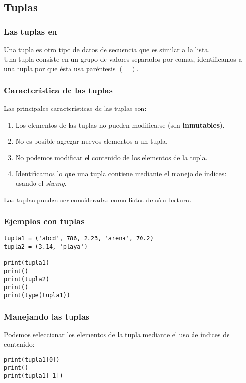 \documentclass[12pt]{beamer}
\begin{document}
\subsection{Tuplas}

\begin{frame}
\frametitle{Las tuplas en \python}
Una tupla es otro tipo de datos de secuencia que es similar a la lista.
\\
\bigskip
\pause
Una tupla consiste en un grupo de valores separados por comas, identificamos a una tupla por que ésta usa paréntesis $( \quad )$.
\end{frame}
\begin{frame}
\frametitle{Característica de las tuplas}
Las principales características de las tuplas son:
\pause
{}
\begin{enumerate}[<+->]
\item Los elementos de las tuplas no pueden modificarse (son \textbf{inmutables}).
\item No es posible agregar nuevos elementos a un tupla.
\item No podemos modificar el contenido de los elementos de la tupla.
\item Identificamos lo que una tupla contiene mediante el manejo de índices: usando el \emph{slicing}.
\end{enumerate}
\pause
Las tuplas pueden ser consideradas como listas de sólo lectura.
\end{frame}
\begin{frame}[fragile]
\frametitle{Ejemplos con tuplas}
\begin{lstlisting}[caption=Definiendo tuplas]
tupla1 = ('abcd', 786, 2.23, 'arena', 70.2)
tupla2 = (3.14, 'playa')

print(tupla1)
print()
print(tupla2)
print()
print(type(tupla1))
\end{lstlisting}
\end{frame}
\begin{frame}[fragile]
\frametitle{Manejando las tuplas}
Podemos seleccionar los elementos de la tupla mediante el uso de índices de contenido:
\pause
\begin{lstlisting}[caption=Recuperando elementos de una tupla]
print(tupla1[0])
print()
print(tupla1[-1])
\end{lstlisting}
\end{frame}
\end{document}
